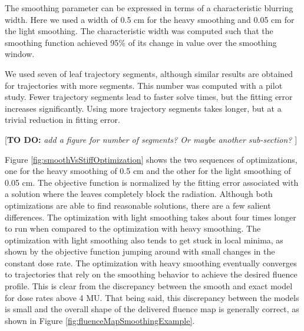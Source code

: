 \documentclass[12pt]{article}
\newcommand{\todo}[1]{{\color{lightblue}\par {[{\bf TO DO: } {\em #1}} ] \\    }}
\begin{document}
The smoothing parameter can be expressed in terms of a characteristic blurring width.
Here we used a width of 0.5 cm for the heavy smoothing and 0.05 cm for the light smoothing.
The characteristic width was computed such that the smoothing function achieved 95\% of its
change in value over the smoothing window.

We used seven of leaf trajectory segments, although similar results are obtained for trajectories with more segments.
This number was computed with a pilot study.
Fewer trajectory segments lead to faster solve times, but the fitting error increases significantly.
Using more trajectory segments takes longer, but at a trivial reduction in fitting error.
\todo{add a figure for number of segments? Or maybe another sub-section?}

Figure \ref{fig:smoothVsStiffOptimization} shows the two sequences of optimizations, one for the
heavy smoothing of 0.5 cm and the other for the light smoothing of 0.05 cm.
The objective function is normalized by the fitting error associated with a solution where the
leaves completely block the radiation.
Although both optimizations are able to find reasonable solutions, there are a few salient differences.
The optimization with light smoothing takes about four times longer to run when
compared to the optimization with heavy smoothing.
The optimization with light smoothing also tends to get stuck in local minima, as shown by the
objective function jumping around with small changes in the constant dose rate.
The optimization with heavy smoothing eventually converges to trajectories that rely on the
smoothing behavior to achieve the desired fluence profile. This is clear from the discrepancy
between the smooth and exact model for dose rates above 4 MU.
That being said, this discrepancy between the models is small and the overall shape of the delivered
fluence map is generally correct, as shown in Figure \ref{fig:fluenceMapSmoothingExample}.
\end{document}
